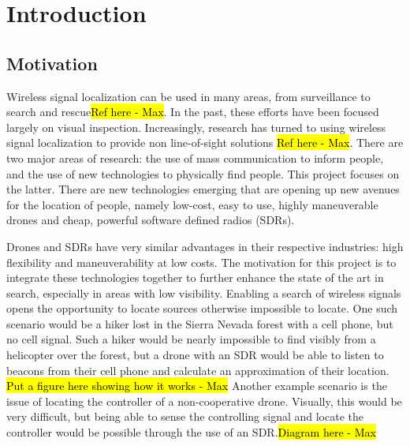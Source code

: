 \chapter{Introduction}

\section{Motivation}
Wireless signal localization can be used in many areas, from surveillance to search and rescue\hl{Ref here - Max}. In the past, these efforts have been focused largely on visual inspection. Increasingly, research has turned to using wireless signal localization to provide non line-of-sight solutions \hl{Ref here - Max}. There are two major areas of research: the use of mass communication to inform people, and the use of new technologies to physically find people. This project focuses on the latter. There are new technologies emerging that are opening up new avenues for the location of people, namely low-cost, easy to use, highly maneuverable drones and cheap, powerful software defined radios (SDRs). \par
Drones and SDRs have very similar advantages in their respective industries: high flexibility and maneuverability at low costs. The motivation for this project is to integrate these technologies together to further enhance the state of the art in search, especially in areas with low visibility. Enabling a search of wireless signals opens the opportunity to locate sources otherwise impossible to locate. One such scenario would be a hiker lost in the Sierra Nevada forest with a cell phone, but no cell signal. Such a hiker would be nearly impossible to find visibly from a helicopter over the forest, but a drone with an SDR would be able to listen to beacons from their cell phone and calculate an approximation of their location. \hl{Put a figure here showing how it works - Max}
Another example scenario is the issue of locating the controller of a non-cooperative drone. Visually, this would be very difficult, but being able to sense the controlling signal and locate the controller would be possible through the use of an SDR.\hl{Diagram here - Max}\par
